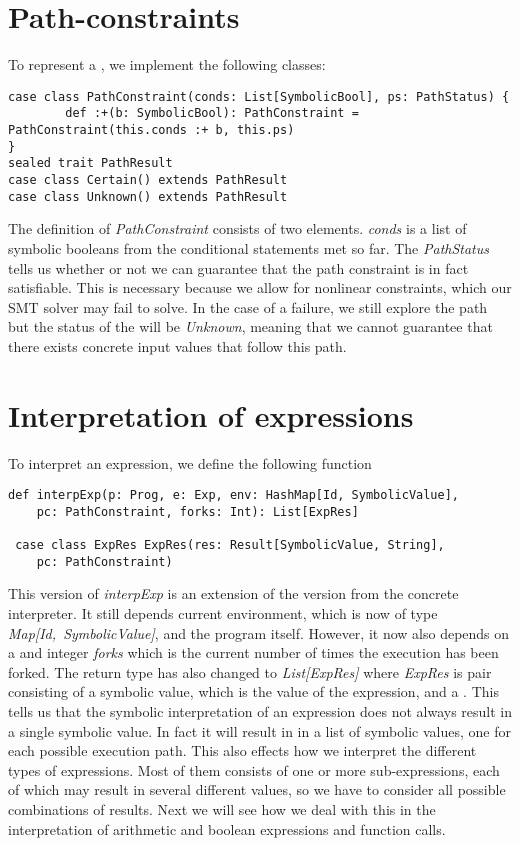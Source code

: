\section{Path-constraints}
To represent a \pc, we implement the following classes:

\begin{lstlisting}[style=simple]
case class PathConstraint(conds: List[SymbolicBool], ps: PathStatus) {
		def :+(b: SymbolicBool): PathConstraint = PathConstraint(this.conds :+ b, this.ps)
}
sealed trait PathResult
case class Certain() extends PathResult
case class Unknown() extends PathResult
\end{lstlisting}

The definition of \textsl{PathConstraint} consists of two elements. \textsl{conds} is a  list of symbolic booleans from the conditional statements met so far. The \textsl{PathStatus} tells us whether or not we can guarantee that the path constraint is in fact satisfiable. This is necessary because we allow for nonlinear constraints, which our SMT solver may fail to solve. In the case of a failure, we still explore the path but the status of the \pc will be \textsl{Unknown}, meaning that we cannot guarantee that there exists concrete input values that follow this path.

\section{Interpretation of expressions}
To interpret an expression, we define the following function

\begin{lstlisting}[style = simple]
 def interpExp(p: Prog, e: Exp, env: HashMap[Id, SymbolicValue], 
 	pc: PathConstraint, forks: Int): List[ExpRes]
  
 case class ExpRes ExpRes(res: Result[SymbolicValue, String], 
 	pc: PathConstraint)
\end{lstlisting}

This version of \textsl{interpExp} is an extension of the version from the concrete interpreter. It still depends current environment, which is now of type \mbox{\textsl{Map[Id, SymbolicValue]}}, and the program itself. However, it now also depends on a \pc and integer \textsl{forks} which is the current number of times the execution has been forked. The return type has also changed to \textsl{List[ExpRes]} where \textsl{ExpRes} is pair consisting of a symbolic value, which is the value of the expression, and a \pc. This tells us that the symbolic interpretation of an expression does not always result in a single symbolic value. In fact it will result in in a list of symbolic values, one for each possible execution path. This also effects how we interpret the different types of expressions. Most of them consists of one or more sub-expressions, each of which may result in several different values, so we have to consider all possible combinations of results. Next we will see how we deal with this in the interpretation of arithmetic and boolean expressions and function calls. 

